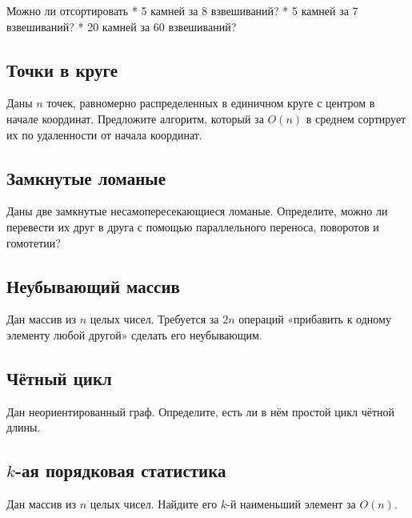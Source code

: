 \documentclass[11pt]{article}
\begin{document}
Можно ли отсортировать * 5 камней за 8 взвешиваний? * 5 камней за 7
взвешиваний? * 20 камней за 60 взвешиваний?

    \subsection{Точки в
круге}\label{ux442ux43eux447ux43aux438-ux432-ux43aux440ux443ux433ux435}

Даны \(n\) точек, равномерно распределенных в единичном круге с центром
в начале координат. Предложите алгоритм, который за \(O(n)\) в среднем
сортирует их по удаленности от начала координат.

    \subsection{Замкнутые
ломаные}\label{ux437ux430ux43cux43aux43dux443ux442ux44bux435-ux43bux43eux43cux430ux43dux44bux435}

Даны две замкнутые несамопересекающиеся ломаные. Определите, можно ли
перевести их друг в друга с помощью параллельного переноса, поворотов и
гомотетии?

    \subsection{Неубывающий
массив}\label{ux43dux435ux443ux431ux44bux432ux430ux44eux449ux438ux439-ux43cux430ux441ux441ux438ux432}

Дан массив из \(n\) целых чисел. Требуется за \(2n\) операций «прибавить
к одному элементу любой другой» сделать его неубывающим.

    \subsection{Чётный
цикл}\label{ux447ux451ux442ux43dux44bux439-ux446ux438ux43aux43b}

Дан неориентированный граф. Определите, есть ли в нём простой цикл
чётной длины.

    \subsection{\texorpdfstring{\(k\)-ая порядковая
статистика}{k-ая порядковая статистика}}\label{k-ux430ux44f-ux43fux43eux440ux44fux434ux43aux43eux432ux430ux44f-ux441ux442ux430ux442ux438ux441ux442ux438ux43aux430}

Дан массив из \(n\) целых чисел. Найдите его \(k\)-й наименьший элемент
за \(O(n)\).
\end{document}
